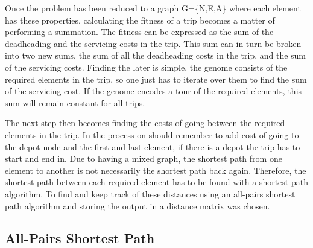 Once the problem has been reduced to a graph G=\{N,E,A\} where each element has these properties, calculating the fitness of a trip becomes a matter of performing a summation. The fitness can be expressed as the sum of the deadheading and the servicing costs in the trip. This sum can in turn be broken into two new sums, the sum of all the deadheading costs in the trip, and the sum of the servicing costs. Finding the later is simple, the genome consists of the required elements in the trip, so one just has to iterate over them to find the sum of the servicing cost. If the genome encodes a tour of the required elements, this sum will remain constant for all trips.

The next step then becomes finding the costs of going between the required elements in the trip. In the process on should remember to add cost of going to the depot node and the first and last element, if there is a depot the trip has to start and end in. Due to having a mixed graph, the shortest path from one element to another is not necessarily the shortest path back again. Therefore, the shortest path between each required element has to be found with a shortest path algorithm. To find and keep track of these distances using an all-pairs shortest path algorithm and storing the output in a distance matrix was chosen.


\subsection{All-Pairs Shortest Path} %
\label{sub:all_pairs_shortest_path}


